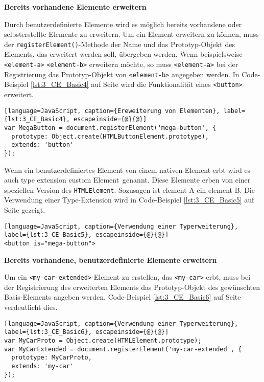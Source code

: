 \textbf{Bereits vorhandene Elemente erweitern}

Durch benutzerdefinierte Elemente wird es möglich bereits vorhandene oder selbsterstellte Elemente zu erweitern. Um ein Element erweitern zu können, muss der \lstinline|registerElement()|-Methode der Name und das Prototyp-Objekt des Elements, das erweitert werden soll, übergeben werden. Wenn beispielsweise \lstinline|<element-a>| \lstinline|<element-b>| erweitern möchte, so muss \lstinline|<element-a>| bei der Registrierung das Prototyp-Objekt von \lstinline|<element-b>| angegeben werden. In Code-Beispiel \ref{lst:3_CE_Basic4} auf Seite \pageref{lst:3_CE_Basic4} wird die Funktionalität eines \lstinline|<button>| erweitert.

\begin{lstlisting}[language=JavaScript, caption={Ereweiterung von Elementen}, label={lst:3_CE_Basic4}, escapeinside={@}{@}]
var MegaButton = document.registerElement('mega-button', {
  prototype: Object.create(HTMLButtonElement.prototype),
  extends: 'button'
});
\end{lstlisting}

Wenn ein benutzerdefiniertes Element von einem nativen Element erbt wird es auch \glqq type extension custom Element\grqq\ genannt. Diese Elemente erben von einer speziellen Version des \lstinline|HTMLElement|. Sozusagen \glqq ist element A ein element B\grqq . Die Verwendung einer Type-Extension wird in Code-Beispiel \ref{lst:3_CE_Basic5} auf Seite \pageref{lst:3_CE_Basic5} gezeigt.

\begin{lstlisting}[language=JavaScript, caption={Verwendung einer Typerweiterung}, label={lst:3_CE_Basic5}, escapeinside={@}{@}]
<button is="mega-button">
\end{lstlisting}

\textbf{Bereits vorhandene, benutzerdefinierte Elemente erweitern}

Um ein \lstinline|<my-car-extended>|-Element zu erstellen, das \lstinline|<my-car>| erbt, muss bei der Registrierung des erweiterten Elements das Prototyp-Objekt des gewünschten \glqq Basis\grqq -Elements angeben werden. Code-Beispiel \ref{lst:3_CE_Basic6} auf Seite \pageref{lst:3_CE_Basic6} verdeutlicht dies.

\begin{lstlisting}[language=JavaScript, caption={Verwendung einer Typerweiterung}, label={lst:3_CE_Basic6}, escapeinside={@}{@}]
var MyCarProto = Object.create(HTMLElement.prototype);
var MyCarExtended = document.registerElement('my-car-extended', {
  prototype: MyCarProto,
  extends: 'my-car'
});
\end{lstlisting}


